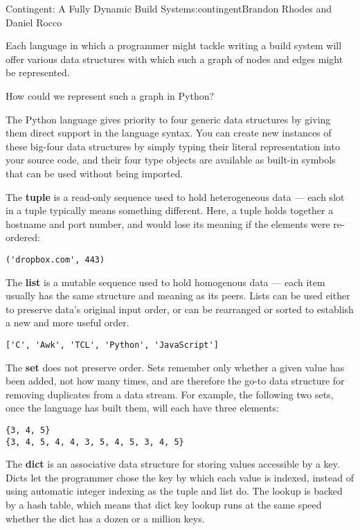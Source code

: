 \begin{aosachapter}{Contingent: A Fully Dynamic Build System}{s:contingent}{Brandon Rhodes and Daniel Rocco}

Each language in which a programmer might tackle writing a build system
will offer various data structures with which such a graph of nodes and
edges might be represented.

How could we represent such a graph in Python?

The Python language gives priority to four generic data structures by
giving them direct support in the language syntax. You can create new
instances of these big-four data structures by simply typing their
literal representation into your source code, and their four type
objects are available as built-in symbols that can be used without being
imported.

The \textbf{tuple} is a read-only sequence used to hold heterogeneous
data --- each slot in a tuple typically means something different. Here,
a tuple holds together a hostname and port number, and would lose its
meaning if the elements were re-ordered:

\begin{verbatim}
('dropbox.com', 443)
\end{verbatim}

The \textbf{list} is a mutable sequence used to hold homogenous data ---
each item usually has the same structure and meaning as its peers. Lists
can be used either to preserve data's original input order, or can be
rearranged or sorted to establish a new and more useful order.

\begin{verbatim}
['C', 'Awk', 'TCL', 'Python', 'JavaScript']
\end{verbatim}

The \textbf{set} does not preserve order. Sets remember only whether a
given value has been added, not how many times, and are therefore the
go-to data structure for removing duplicates from a data stream. For
example, the following two sets, once the language has built them, will
each have three elements:

\begin{verbatim}
{3, 4, 5}
{3, 4, 5, 4, 4, 3, 5, 4, 5, 3, 4, 5}
\end{verbatim}

The \textbf{dict} is an associative data structure for storing values
accessible by a key. Dicts let the programmer chose the key by which
each value is indexed, instead of using automatic integer indexing as
the tuple and list do. The lookup is backed by a hash table, which means
that dict key lookup runs at the same speed whether the dict has a dozen
or a million keys.


\end{aosachapter}
